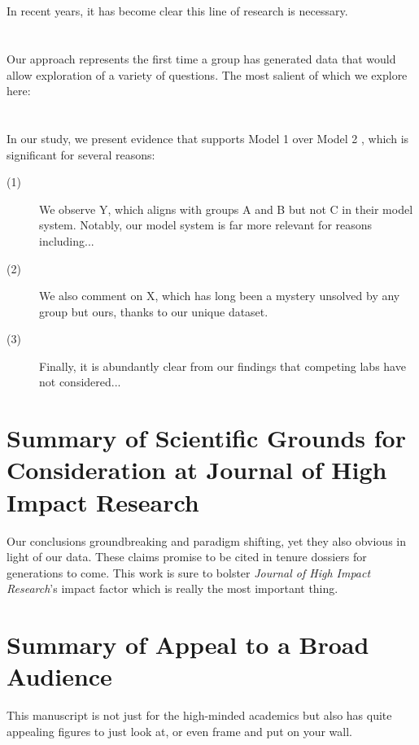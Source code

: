 \documentclass[11pt]{article}
\newcommand{\journalname}{Journal of High Impact Research} %
\begin{document}
\section{}
\noindent In recent years, it has become clear this line of research is necessary. \lipsum[1] 

\section{}
\noindent Our approach represents the first time a group has generated data that would allow exploration of a variety of questions. The most salient of which we explore here: 

\section{}
In our study, we present evidence that supports Model 1 \citep{zany2023quantum} over Model 2 \citep{wacky2023spaghetti}, which is significant for several reasons:

\begin{description}
  \item[(1)] We observe Y, which aligns with groups A and B but not C in their model system. Notably, our model system is far more relevant for reasons including...
  \item[(2)] We also comment on X, which has long been a mystery unsolved by any group but ours, thanks to our unique dataset.
  \item[(3)] Finally, it is abundantly clear from our findings that competing labs have not considered...
\end{description}

\clearpage %
\restoregeometry %
\section{Summary of Scientific Grounds for Consideration at \journalname}
\noindent Our conclusions groundbreaking and paradigm shifting, yet they also obvious in light of our data. These claims promise to be cited in tenure dossiers for generations to come. This work is sure to bolster \textit{\journalname}'s impact factor which is really the most important thing. 

\section{Summary of Appeal to a Broad Audience}
\noindent This manuscript is not just for the high-minded academics but also has quite appealing figures to just look at, or even frame and put on your wall. 
\end{document}
